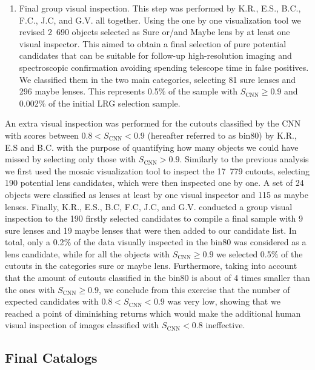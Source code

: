 \documentclass[tradiabstract,twocolumn]{aa}
\begin{document}
\begin{enumerate}
\item Final group visual inspection. This step was performed by K.R., E.S., B.C., F.C., J.C, and G.V. all together. Using the one by one visualization tool we revised 2~690 objects selected as Sure or/and Maybe lens by at least one visual inspector. This aimed to obtain a final selection of pure potential candidates that can be suitable for follow-up high-resolution imaging and spectroscopic confirmation avoiding spending telescope time in false positives. We classified them in the two main categories, selecting 81 sure lenses and 296 maybe lenses. This represents 0.5$\%$ of the sample with $ S_{\text{CNN}} \geq 0.9 $ and 0.002$\%$ of the initial LRG selection sample.

\end{enumerate}

An extra visual inspection was performed for the cutouts classified by the CNN with scores between $0.8< S_{\text{CNN}} < 0.9 $ (hereafter referred to as bin80) by K.R., E.S and B.C. with the purpose of quantifying how many objects we could have missed by selecting only those with $ S_{\text{CNN}} > 0.9 $. Similarly to the previous analysis we first used the mosaic visualization tool to inspect the 17~779 cutouts, selecting 190 potential lens candidates, which were then inspected one by one. A set of 24 objects were classified as lenses at least by one visual inspector and 115 as maybe lenses. Finally, K.R., E.S., B.C, F.C, J.C, and G.V. conducted a group visual inspection to the 190 firstly selected candidates to compile a final sample with 9 sure lenses and 19 maybe lenses that were then added to our candidate list. In total, only a 0.2$\%$ of the data visually inspected in the bin80 was considered as a lens candidate, while for all the objects with $S_{\text{CNN}} \geq 0.9 $ we selected 0.5$\%$ of the cutouts in the categories sure or maybe lens. Furthermore, taking into account that the amount of cutouts classified in the bin80 is about of 4 times smaller than the ones with $S_{\text{CNN}} \geq 0.9$, we conclude from this exercise that the number of expected candidates with $0.8 < S_{\text{CNN}} < 0.9 $ was very low, showing that we reached a point of diminishing returns which would make the additional human visual inspection of images classified with $S_{\text{CNN}} < 0.8$ ineffective.

\subsection{Final Catalogs} \label{subsec:final_cat}
\end{document}
